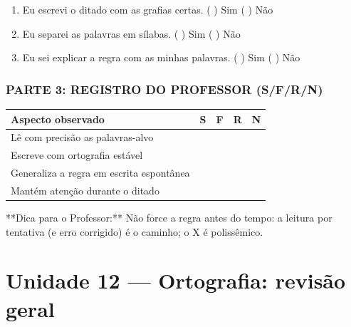 \begin{exercicio}
\begin{enumerate}[label=\alph*)]
  \item Eu escrevi o ditado com as grafias certas.  \quad ( ) Sim   ( ) Não

  \item Eu separei as palavras em sílabas.  \quad ( ) Sim   ( ) Não

  \item Eu sei explicar a regra com as minhas palavras.  \quad ( ) Sim   ( ) Não

\end{enumerate}

\subsection*{PARTE 3: REGISTRO DO PROFESSOR (S/F/R/N)}

\begin{center}
\renewcommand{\arraystretch}{1.4}
\begin{tabular}{@{}p{9cm}cccc@{}}
\toprule
Aspecto observado & S & F & R & N \\
\midrule
Lê com precisão as palavras-alvo & & & & \\
Escreve com ortografia estável & & & & \\
Generaliza a regra em escrita espontânea & & & & \\
Mantém atenção durante o ditado & & & & \\
\bottomrule\end{tabular}\end{center}

\end{exercicio}

\begin{dica}
**Dica para o Professor:** Não force a regra antes do tempo: a leitura por tentativa (e erro corrigido) é o caminho; o X é polissêmico.
\end{dica}


\chapter{Unidade 12 --- Ortografia: revisão geral}


